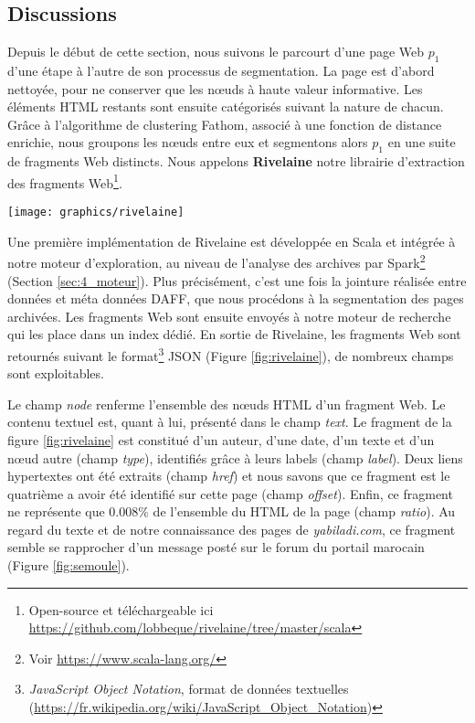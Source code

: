 \documentclass[symmetric,justified,marginals=raggedouter]{tufte-book}
\begin{document}
\subsection{Discussions}

\noindent Depuis le début de cette section, nous suivons le parcourt d'une page Web $p_1$ d'une étape à l'autre de son processus de segmentation. La page est d'abord nettoyée, pour ne conserver que les nœuds à haute valeur informative. Les éléments HTML restants sont ensuite catégorisés suivant la nature de chacun. Grâce à l'algorithme de clustering Fathom, associé à une fonction de distance enrichie, nous groupons les nœuds entre eux et segmentons alors $p_1$ en une suite de fragments Web distincts. Nous appelons \textbf{Rivelaine} notre librairie d'extraction des fragments Web\footnote{Open-source et téléchargeable ici \url{https://github.com/lobbeque/rivelaine/tree/master/scala}}.

\begin{figure*}%
  \texttt{[image: graphics/rivelaine]}
  \caption{Fragment Web de la page \url{https://www.yabiladi.com/forum/semoule-fine-pour-couscous-54-9290786.html}, tel que retourné par Rivelaine}
  \label{fig:rivelaine}
\end{figure*}

\noindent Une première implémentation de Rivelaine est développée en Scala et intégrée à notre moteur d'exploration, au niveau de l'analyse des archives par Spark\footnote{Voir \url{https://www.scala-lang.org/}} (Section \ref{sec:4_moteur}). Plus précisément, c'est une fois la jointure réalisée entre données et méta données DAFF, que nous procédons à la segmentation des pages archivées. Les fragments Web sont ensuite envoyés à notre moteur de recherche qui les place dans un index dédié. En sortie de Rivelaine, les fragments Web sont retournés suivant le format\footnote{\textit{JavaScript Object Notation}, format de données textuelles (\url{https://fr.wikipedia.org/wiki/JavaScript\_Object\_Notation})} JSON (Figure \ref{fig:rivelaine}), de nombreux champs sont exploitables.

Le champ \textit{node} renferme l'ensemble des nœuds HTML d'un fragment Web. Le contenu textuel est, quant à lui, présenté dans le champ \textit{text}. Le fragment de la figure \ref{fig:rivelaine} est constitué d'un auteur, d'une date, d'un texte et d'un nœud autre (champ \textit{type}), identifiés grâce à leurs labels (champ \textit{label}). Deux liens hypertextes ont été extraits (champ \textit{href}) et nous savons que ce fragment est le quatrième a avoir été identifié sur cette page (champ \textit{offset}). Enfin, ce fragment ne représente que $0.008\%$ de l'ensemble du HTML de la page (champ \textit{ratio}). Au regard du texte et de notre connaissance des pages de \textit{yabiladi.com}, ce fragment semble se rapprocher d'un message posté sur le forum du portail marocain (Figure \ref{fig:semoule}). \\
\end{document}
